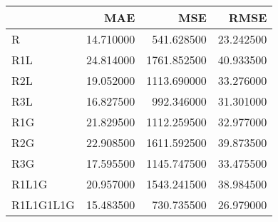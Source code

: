 \begin{tabular}{lrrr}
\toprule
 & MAE & MSE & RMSE \\
\midrule
R & 14.710000 & 541.628500 & 23.242500 \\
R1L & 24.814000 & 1761.852500 & 40.933500 \\
R2L & 19.052000 & 1113.690000 & 33.276000 \\
R3L & 16.827500 & 992.346000 & 31.301000 \\
R1G & 21.829500 & 1112.259500 & 32.977000 \\
R2G & 22.908500 & 1611.592500 & 39.873500 \\
R3G & 17.595500 & 1145.747500 & 33.475500 \\
R1L1G & 20.957000 & 1543.241500 & 38.984500 \\
R1L1G1L1G & 15.483500 & 730.735500 & 26.979000 \\
\bottomrule
\end{tabular}
